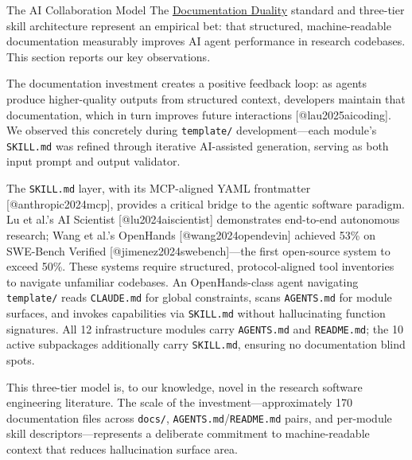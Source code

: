 \documentclass[
  ignorenonframetext,
]{beamer}
\author{\texorpdfstring{}{}}
\date{}
\begin{document}
\begin{frame}[fragile]{The AI Collaboration Model}
\protect{}\label{the-ai-collaboration-model}
The
\href{03c_documentation.md\#documentation-duality-and-ai-collaboration}{Documentation
Duality} standard and three-tier skill architecture represent an
empirical bet: that structured, machine-readable documentation
measurably improves AI agent performance in research codebases. This
section reports our key observations.

The documentation investment creates a positive feedback loop: as agents
produce higher-quality outputs from structured context, developers
maintain that documentation, which in turn improves future interactions
{[}@lau2025aicoding{]}. We observed this concretely during
\texttt{template/} development---each module's \texttt{SKILL.md} was
refined through iterative AI-assisted generation, serving as both input
prompt and output validator.

The \texttt{SKILL.md} layer, with its MCP-aligned YAML frontmatter
{[}@anthropic2024mcp{]}, provides a critical bridge to the agentic
software paradigm. Lu et al.'s AI Scientist {[}@lu2024aiscientist{]}
demonstrates end-to-end autonomous research; Wang et al.'s OpenHands
{[}@wang2024opendevin{]} achieved 53\% on SWE-Bench Verified
{[}@jimenez2024swebench{]}---the first open-source system to exceed
50\%. These systems require structured, protocol-aligned tool
inventories to navigate unfamiliar codebases. An OpenHands-class agent
navigating \texttt{template/} reads \texttt{CLAUDE.md} for global
constraints, scans \texttt{AGENTS.md} for module surfaces, and invokes
capabilities via \texttt{SKILL.md} without hallucinating function
signatures. All 12 infrastructure modules carry \texttt{AGENTS.md} and
\texttt{README.md}; the 10 active subpackages additionally carry
\texttt{SKILL.md}, ensuring no documentation blind spots.

This three-tier model is, to our knowledge, novel in the research
software engineering literature. The scale of the
investment---approximately 170 documentation files across
\texttt{docs/}, \texttt{AGENTS.md}/\texttt{README.md} pairs, and
per-module skill descriptors---represents a deliberate commitment to
machine-readable context that reduces hallucination surface area.
\end{frame}
\end{document}
